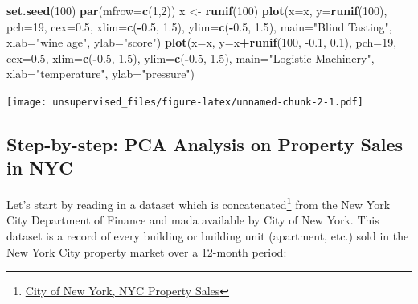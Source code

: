 \documentclass[]{article}
\newenvironment{Shaded}{\begin{snugshade}}{\end{snugshade}}
\newcommand{\DataTypeTok}[1]{\textcolor[rgb]{0.13,0.29,0.53}{#1}}
\newcommand{\DecValTok}[1]{\textcolor[rgb]{0.00,0.00,0.81}{#1}}
\newcommand{\FloatTok}[1]{\textcolor[rgb]{0.00,0.00,0.81}{#1}}
\newcommand{\KeywordTok}[1]{\textcolor[rgb]{0.13,0.29,0.53}{\textbf{#1}}}
\newcommand{\NormalTok}[1]{#1}
\newcommand{\OperatorTok}[1]{\textcolor[rgb]{0.81,0.36,0.00}{\textbf{#1}}}
\newcommand{\StringTok}[1]{\textcolor[rgb]{0.31,0.60,0.02}{#1}}
\let\rmarkdownfootnote\footnote%
\def\footnote{\protect\rmarkdownfootnote}
\begin{document}
\begin{Shaded}
\begin{Highlighting}[]
\KeywordTok{set.seed}\NormalTok{(}\DecValTok{100}\NormalTok{)}
\KeywordTok{par}\NormalTok{(}\DataTypeTok{mfrow=}\KeywordTok{c}\NormalTok{(}\DecValTok{1}\NormalTok{,}\DecValTok{2}\NormalTok{))}
\NormalTok{x <-}\StringTok{ }\KeywordTok{runif}\NormalTok{(}\DecValTok{100}\NormalTok{)}
\KeywordTok{plot}\NormalTok{(}\DataTypeTok{x=}\NormalTok{x, }\DataTypeTok{y=}\KeywordTok{runif}\NormalTok{(}\DecValTok{100}\NormalTok{), }\DataTypeTok{pch=}\DecValTok{19}\NormalTok{, }\DataTypeTok{cex=}\FloatTok{0.5}\NormalTok{, }\DataTypeTok{xlim=}\KeywordTok{c}\NormalTok{(}\OperatorTok{-}\FloatTok{0.5}\NormalTok{, }\FloatTok{1.5}\NormalTok{), }\DataTypeTok{ylim=}\KeywordTok{c}\NormalTok{(}\OperatorTok{-}\FloatTok{0.5}\NormalTok{, }\FloatTok{1.5}\NormalTok{), }\DataTypeTok{main=}\StringTok{"Blind Tasting"}\NormalTok{, }\DataTypeTok{xlab=}\StringTok{"wine age"}\NormalTok{, }\DataTypeTok{ylab=}\StringTok{"score"}\NormalTok{)}
\KeywordTok{plot}\NormalTok{(}\DataTypeTok{x=}\NormalTok{x, }\DataTypeTok{y=}\NormalTok{x}\OperatorTok{+}\KeywordTok{runif}\NormalTok{(}\DecValTok{100}\NormalTok{, }\FloatTok{-0.1}\NormalTok{, }\FloatTok{0.1}\NormalTok{), }\DataTypeTok{pch=}\DecValTok{19}\NormalTok{, }\DataTypeTok{cex=}\FloatTok{0.5}\NormalTok{, }\DataTypeTok{xlim=}\KeywordTok{c}\NormalTok{(}\OperatorTok{-}\FloatTok{0.5}\NormalTok{, }\FloatTok{1.5}\NormalTok{), }\DataTypeTok{ylim=}\KeywordTok{c}\NormalTok{(}\OperatorTok{-}\FloatTok{0.5}\NormalTok{, }\FloatTok{1.5}\NormalTok{), }\DataTypeTok{main=}\StringTok{"Logistic Machinery"}\NormalTok{, }\DataTypeTok{xlab=}\StringTok{"temperature"}\NormalTok{, }\DataTypeTok{ylab=}\StringTok{"pressure"}\NormalTok{)}
\end{Highlighting}
\end{Shaded}

\texttt{[image: unsupervised\_files/figure-latex/unnamed-chunk-2-1.pdf]}

\hypertarget{step-by-step-pca-analysis-on-property-sales-in-nyc}{%
\subsection{Step-by-step: PCA Analysis on Property Sales in
NYC}\label{step-by-step-pca-analysis-on-property-sales-in-nyc}}

Let's start by reading in a dataset which is concatenated\footnote{\href{https://www.kaggle.com/new-york-city/nyc-property-sales}{City
  of New York, NYC Property Sales}} from the New York City Department of
Finance and mada available by City of New York. This dataset is a record
of every building or building unit (apartment, etc.) sold in the New
York City property market over a 12-month period:
\end{document}
